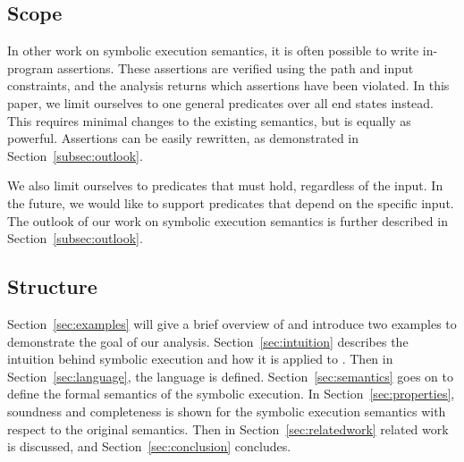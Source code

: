 \subsection{Scope}

In other work on symbolic execution semantics, it is often possible to write in-program assertions.
These assertions are verified using the path and input constraints, and the analysis returns which assertions have been violated.
In this paper, we limit ourselves to one general predicates over all end states instead.
This requires minimal changes to the existing semantics, but is equally as powerful.
Assertions can be easily rewritten, as demonstrated in Section~\ref{subsec:outlook}.

We also limit ourselves to predicates that must hold, regardless of the input.
In the future, we would like to support predicates that depend on the specific input.
The outlook of our work on symbolic execution semantics is further described in Section~\ref{subsec:outlook}.


\subsection{Structure}
Section~\ref{sec:examples} will give a brief overview of \TOPHAT and introduce two examples to demonstrate the goal of our analysis.
Section~\ref{sec:intuition} describes the intuition behind symbolic execution and how it is applied to \TOPHAT.
Then in Section~\ref{sec:language}, the \TOPHAT language is defined.
Section~\ref{sec:semantics} goes on to define the formal semantics of the symbolic execution.
In Section~\ref{sec:properties}, soundness and completeness is shown for the symbolic execution semantics with respect to the original \TOPHAT semantics.
Then in Section~\ref{sec:relatedwork} related work is discussed, and Section~\ref{sec:conclusion} concludes.

